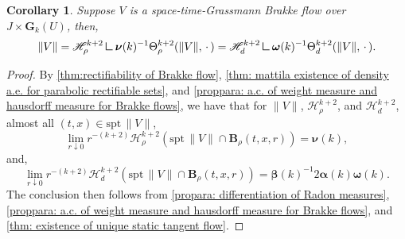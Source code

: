 \documentclass{article}
\theoremstyle{plain}
\theoremstyle{definition}
\theoremstyle{plain}
\newtheorem{corollary}[theorem]{Corollary}
\theoremstyle{remark}
\theoremstyle{remark}
\theoremstyle{plain}
\newcommand{\weight}{\mathbin{\vrule height 1.6ex depth 0pt width
		0.14ex\vrule height 0.14ex depth 0pt width 1.3ex}}
\begin{document}
\begin{corollary}
    Suppose $V$ is a space-time-Grassmann Brakke flow over $J \times \mathbf{G}_{k} (U)$, then, 
    \begin{equation*}
        \| V \| = \mathscr{H}^{k + 2}_{\rho} \weight \boldsymbol{\nu} (k)^{-1} \Theta_{\rho}^{k + 2} (\| V \|, \, \cdot \, ) = \mathscr{H}^{k + 2}_{d} \weight \boldsymbol{\omega} (k)^{-1} \Theta_{d}^{k + 2} (\| V \|, \, \cdot \, ).
    \end{equation*}
\end{corollary}

\begin{proof}
    By \ref{thm:rectifiability of Brakke flow}, \ref{thm: mattila existence of density a.e. for parabolic rectifiable sets}, and \ref{proppara: a.c. of weight measure and hausdorff measure for Brakke flows}, we have that for $\| V \|$, $\mathscr{H}^{k + 2}_{\rho}$, and $\mathscr{H}^{k + 2}_{d}$, almost all $(t, x) \in \mathrm{spt} \, \| V \|$, 
    \begin{equation*}
        \lim_{r \downarrow 0} r^{- (k+2)} \mathscr{H}_{\rho}^{k + 2} (\mathrm{spt} \, \| V \| \cap \mathbf{B}_{\rho} (t, x, r)) = \boldsymbol{\nu} (k), 
    \end{equation*}
    and, 
    \begin{equation*}
        \lim_{r \downarrow 0} r^{- (k+2)} \mathscr{H}_{d}^{k + 2} (\mathrm{spt} \, \| V \| \cap \mathbf{B}_{\rho} (t, x, r)) = \boldsymbol{\beta} (k)^{-1} 2 \boldsymbol{\alpha} (k) \boldsymbol{\omega} (k).
    \end{equation*}
    The conclusion then follows from \ref{propara: differentiation of Radon measures}, \ref{proppara: a.c. of weight measure and hausdorff measure for Brakke flows}, and \ref{thm: existence of unique static tangent flow}.
\end{proof}





\end{document}
